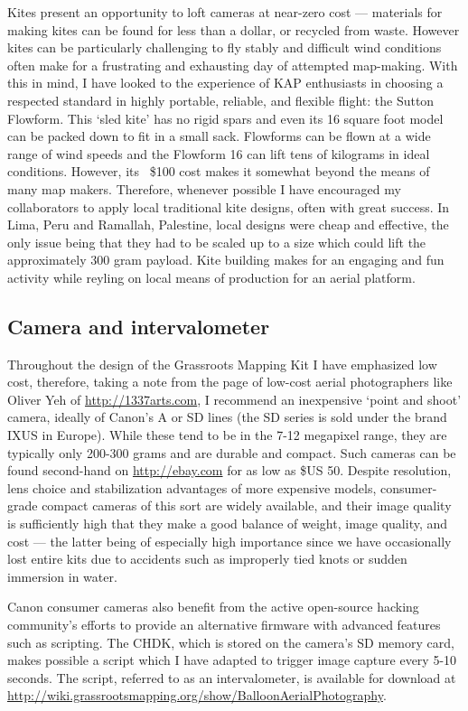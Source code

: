\documentclass[11pt]{report}
\begin{document}
Kites present an opportunity to loft cameras at near-zero cost --- materials for making kites can be found for less than a dollar, or recycled from waste. However kites can be particularly challenging to fly stably and difficult wind conditions often make for a frustrating and exhausting day of attempted map-making. With this in mind, I have looked to the experience of \ac{KAP} enthusiasts in choosing a respected standard in highly portable, reliable, and flexible flight: the Sutton Flowform. This `sled kite' has no rigid spars and even its 16 square foot model can be packed down to fit in a small sack. Flowforms can be flown at a wide range of wind speeds and the Flowform 16 can lift tens of kilograms in ideal conditions. However, its ~\$100 cost makes it somewhat beyond the means of many map makers. Therefore, whenever possible I have encouraged my collaborators to apply local traditional kite designs, often with great success. In Lima, Peru and Ramallah, Palestine, local designs were cheap and effective, the only issue being that they had to be scaled up to a size which could lift the approximately 300 gram payload. Kite building makes for an engaging and fun activity while reyling on local means of production for an aerial platform. 

\subsection{Camera and intervalometer}

Throughout the design of the Grassroots Mapping Kit I have emphasized low cost, therefore, taking a note from the page of low-cost aerial photographers like Oliver Yeh of \url{http://1337arts.com}, I recommend an inexpensive `point and shoot' camera, ideally of Canon's A or SD lines (the SD series is sold under the brand IXUS in Europe). While these tend to be in the 7-12 megapixel range, they are typically only 200-300 grams and are durable and compact. Such cameras can be found second-hand on \url{http://ebay.com} for as low as \$US 50. Despite resolution, lens choice and stabilization advantages of more expensive models, consumer-grade compact cameras of this sort are widely available, and their image quality is sufficiently high that they make a good balance of weight, image quality, and cost --- the latter being of especially high importance since we have occasionally lost entire kits due to accidents such as improperly tied knots or sudden immersion in water. 

Canon consumer cameras also benefit from the active open-source hacking community's efforts to provide an alternative firmware with advanced features such as scripting. The \ac{CHDK}, which is stored on the camera's SD memory card, makes possible a script which I have adapted to trigger image capture every 5-10 seconds. The script, referred to as an intervalometer, is available for download at \url{http://wiki.grassrootsmapping.org/show/BalloonAerialPhotography}.  
\end{document}
